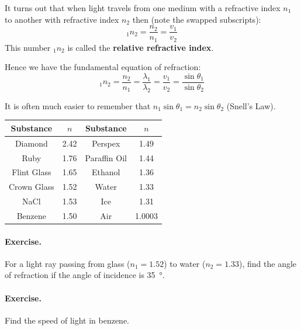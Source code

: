 \documentclass[a4paper]{amsbook}
\begin{document}
It turns out that when light travels from one medium with a refractive index $ n_1 $
to another with refractive index $ n_2 $ then (note the swapped subscripts):
\begin{displaymath}
  _1 n_2 = \frac{n_2}{n_1} = \frac{v_1}{v_2}
\end{displaymath}
This number $ _1 n _2 $ is called the \textbf{relative refractive index}.

Hence we have the fundamental equation of refraction:
\begin{equation}
  _1 n _2 = \frac{n_2}{n_1} = \frac{\lambda_1}{\lambda_2} = \frac{v_1}{v_2} = \frac{\sin \theta_1}{\sin \theta_2}
\end{equation}

It is often much easier to remember that $ n_1 \sin \theta_1 = n_2 \sin \theta_2 $ (Snell's Law).

\begin{center}
\begin{tabular}{c|c||c|c}
  \textbf{Substance} & $ n $ & \textbf{Substance} & $ n $\\\hline
  Diamond & 2.42 & Perspex & 1.49\\
  Ruby & 1.76 & Paraffin Oil & 1.44\\
  Flint Glass & 1.65 & Ethanol & 1.36\\
  Crown Glass & 1.52 & Water & 1.33\\
  NaCl & 1.53 & Ice & 1.31\\
  Benzene & 1.50 & Air & 1.0003\\
\end{tabular}
\end{center}

\paragraph{Exercise.} For a light ray passing from glass ($ n_1 = 1.52 $) to water ($ n_2 = 1.33 $), find the angle
of refraction if the angle of incidence is \SI{35}{\degree}.

\paragraph{Exercise.} Find the speed of light in benzene.
\end{document}
